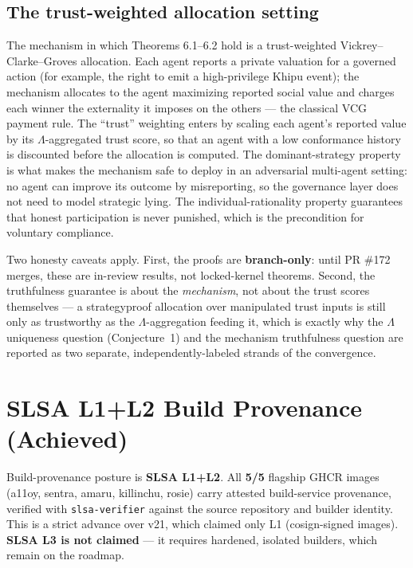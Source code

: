 \documentclass[11pt]{article}
\theoremstyle{plain}
\theoremstyle{definition}
\theoremstyle{remark}
\newcommand{\La}{\Lambda}
\begin{document}
\subsection{The trust-weighted allocation setting}
The mechanism in which Theorems 6.1--6.2 hold is a trust-weighted
Vickrey--Clarke--Groves allocation. Each agent reports a private valuation for a
governed action (for example, the right to emit a high-privilege Khipu event); the
mechanism allocates to the agent maximizing reported social value and charges each
winner the externality it imposes on the others --- the classical VCG payment rule.
The ``trust'' weighting enters by scaling each agent's reported value by its
$\La$-aggregated trust score, so that an agent with a low conformance history is
discounted before the allocation is computed. The dominant-strategy property is what
makes the mechanism safe to deploy in an adversarial multi-agent setting: no agent
can improve its outcome by misreporting, so the governance layer does not need to
model strategic lying. The individual-rationality property guarantees that honest
participation is never punished, which is the precondition for voluntary compliance.

Two honesty caveats apply. First, the proofs are \textbf{branch-only}: until PR \#172
merges, these are in-review results, not locked-kernel theorems. Second, the
truthfulness guarantee is about the \emph{mechanism}, not about the trust scores
themselves --- a strategyproof allocation over manipulated trust inputs is still only
as trustworthy as the $\La$-aggregation feeding it, which is exactly why the $\La$
uniqueness question (Conjecture~1) and the mechanism truthfulness question are
reported as two separate, independently-labeled strands of the convergence.

\section{SLSA L1+L2 Build Provenance (Achieved)}

Build-provenance posture is \textbf{SLSA L1+L2}. All \textbf{5/5} flagship GHCR
images (a11oy, sentra, amaru, killinchu, rosie) carry attested build-service
provenance, verified with \texttt{slsa-verifier} against the source repository and
builder identity. This is a strict advance over v21, which claimed only L1
(cosign-signed images). \textbf{SLSA L3 is not claimed} --- it requires hardened,
isolated builders, which remain on the roadmap.
\end{document}
